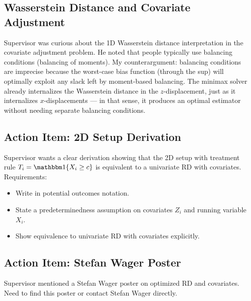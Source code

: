 \documentclass[12pt,a4paper]{article}
\begin{document}
\subsection*{Wasserstein Distance and Covariate Adjustment}
Supervisor was curious about the 1D Wasserstein distance interpretation in the covariate adjustment problem. He noted that people typically use balancing conditions (balancing of moments).
My counterargument: balancing conditions are imprecise because the worst-case bias function (through the sup) will optimally exploit any slack left by moment-based balancing. The minimax solver already internalizes the Wasserstein distance in the $z$-displacement, just as it internalizes $x$-displacements --- in that sense, it produces an optimal estimator without needing separate balancing conditions.

\subsection*{Action Item: 2D Setup Derivation}
Supervisor wants a clear derivation showing that the 2D setup with treatment rule $T_i = \ind\{X_i \geq c\}$ is equivalent to a univariate RD with covariates. Requirements:
\begin{itemize}
	\item Write in potential outcomes notation.
	\item State a predeterminedness assumption on covariates $Z_i$ and running variable $X_i$.
	\item Show equivalence to univariate RD with covariates explicitly.
\end{itemize}

\subsection*{Action Item: Stefan Wager Poster}
Supervisor mentioned a Stefan Wager poster on optimized RD and covariates. Need to find this poster or contact Stefan Wager directly.
\end{document}
